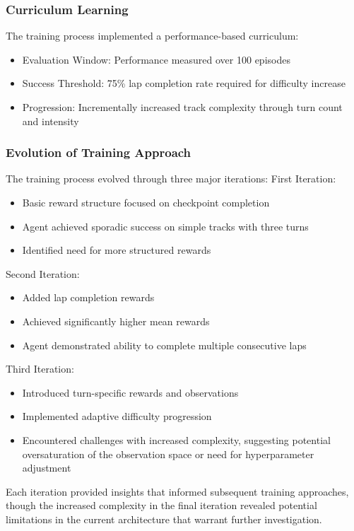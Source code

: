 \documentclass[10pt,twocolumn]{article}
\begin{document}
\subsubsection{Curriculum Learning}
The training process implemented a performance-based curriculum:
\begin{itemize}
    \item Evaluation Window: Performance measured over 100 episodes
    \item Success Threshold: 75\% lap completion rate required for difficulty increase
    \item Progression: Incrementally increased track complexity through turn count and intensity
\end{itemize}

\subsubsection{Evolution of Training Approach}
The training process evolved through three major iterations:
First Iteration:
\begin{itemize}
    \item Basic reward structure focused on checkpoint completion
    \item Agent achieved sporadic success on simple tracks with three turns
    \item Identified need for more structured rewards
\end{itemize}
Second Iteration:
\begin{itemize}
    \item Added lap completion rewards
    \item Achieved significantly higher mean rewards
    \item Agent demonstrated ability to complete multiple consecutive laps
\end{itemize}
Third Iteration:
\begin{itemize}
    \item Introduced turn-specific rewards and observations
    \item Implemented adaptive difficulty progression
    \item Encountered challenges with increased complexity, suggesting potential oversaturation of the observation space or need for hyperparameter adjustment
\end{itemize}
Each iteration provided insights that informed subsequent training approaches, though the increased complexity in the final iteration revealed potential limitations in the current architecture that warrant further investigation.
\end{document}
